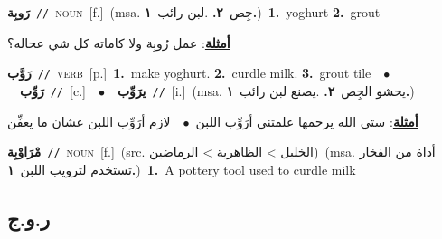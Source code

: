 \documentclass[10pt,a4paper,twoside]{article} %
\begin{document}
\begin{multicols}{2}
{\setlength\topsep{0pt}\textbf{\foreignlanguage{arabic}{رَوبِة}}\ {\color{gray}\texttt{//}\color{black}}\ \textsc{noun}\ [f.]\ \color{gray}(msa. \foreignlanguage{arabic}{جِص}~\foreignlanguage{arabic}{\textbf{٢.}}  .\foreignlanguage{arabic}{لبن رائب}~\foreignlanguage{arabic}{\textbf{١.}})\color{black}\ \textbf{1.}~yoghurt  \textbf{2.}~grout\  \begin{flushright}\color{gray}\foreignlanguage{arabic}{\textbf{\underline{\foreignlanguage{arabic}{أمثلة}}}: عمل رُوبِة ولا كاماته كل شي عحاله؟}\end{flushright}\color{black}} \vspace{2mm}

{\setlength\topsep{0pt}\textbf{\foreignlanguage{arabic}{رَوَّب}}\ {\color{gray}\texttt{//}\color{black}}\ \textsc{verb}\ [p.]\ \textbf{1.}~make yoghurt.  \textbf{2.}~curdle milk.  \textbf{3.}~grout tile\ \ $\bullet$\ \ \setlength\topsep{0pt}\textbf{\foreignlanguage{arabic}{رَوِّب}}\ {\color{gray}\texttt{//}\color{black}}\ [c.]\ \ $\bullet$\ \ \setlength\topsep{0pt}\textbf{\foreignlanguage{arabic}{يرَوِّب}}\ {\color{gray}\texttt{//}\color{black}}\ [i.]\ \color{gray}(msa. \foreignlanguage{arabic}{يحشو الجِص}~\foreignlanguage{arabic}{\textbf{٢.}}  .\foreignlanguage{arabic}{يصنع لبن رائب}~\foreignlanguage{arabic}{\textbf{١.}})\color{black}\  \begin{flushright}\color{gray}\foreignlanguage{arabic}{\textbf{\underline{\foreignlanguage{arabic}{أمثلة}}}: ستي الله يرحمها علمتني أرَوِّب اللبن\ $\bullet$\ \  لازم أرَوِّب اللبن عشان ما يعفِّن}\end{flushright}\color{black}} \vspace{2mm}

{\setlength\topsep{0pt}\textbf{\foreignlanguage{arabic}{مْرَاوْبِة}}\ {\color{gray}\texttt{//}\color{black}}\ \textsc{noun}\ [f.]\ (src. \color{gray}\foreignlanguage{arabic}{الخليل > الظاهرية > الرماضين}\color{black})\ \color{gray}(msa. \foreignlanguage{arabic}{أداة من الفخار تستخدم لترويب اللبن}~\foreignlanguage{arabic}{\textbf{١.}})\color{black}\ \textbf{1.}~A pottery tool used to curdle milk\ } \vspace{2mm}

\vspace{-3mm}
\subsection*{\color{blue}\foreignlanguage{arabic}{ر.و.ج}\color{blue}{}} 


\end{multicols}
\end{document}
